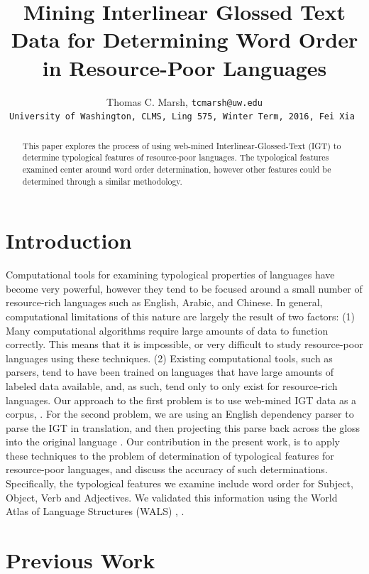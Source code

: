 \documentclass[]{article}
\title{Mining Interlinear Glossed Text Data for Determining Word Order in Resource-Poor Languages}
\author{
  Thomas C. Marsh, \tt{tcmarsh@uw.edu}\\ University of Washington, CLMS, Ling 575, Winter Term, 2016, Fei Xia
 }
\begin{document}
\maketitle

\begin{abstract}
\addtolength{\leftskip}{-6mm}
This paper explores the process of using web-mined Interlinear-Glossed-Text (IGT) to determine typological features of resource-poor languages.  The typological features examined center around word order determination, however other features could be determined through a similar methodology.
\end{abstract}


\section{Introduction}

Computational tools for examining typological properties of languages have become very powerful, however they tend to be focused around a small number of resource-rich languages such as English, Arabic, and Chinese.  In general, computational limitations of this nature are largely the result of two factors:   (1) Many computational algorithms require large amounts of data to function correctly.  This means that it is impossible, or very difficult to study resource-poor languages using these techniques.  (2) Existing computational tools, such as parsers, tend to have been trained on languages that have large amounts of labeled data available, and, as such, tend only to only exist for resource-rich languages.  Our approach to the first problem is to use web-mined IGT data as a corpus, \cite{lewis2006odin}.  For the second problem, we are using an English dependency parser \cite{de2006generating} to parse the IGT in translation, and then projecting this parse back across the gloss into the original language \cite{xia2007multilingual}.  Our contribution in the present work, is to apply these techniques to the problem of  determination of typological features for resource-poor languages, and discuss the accuracy of such determinations.  Specifically, the typological features we examine include word order for Subject, Object, Verb and Adjectives.  We validated this information using the World Atlas of Language Structures (WALS) \cite{wals}, \cite{haspelmath2005world}.

\section{Previous Work}
\end{document}
